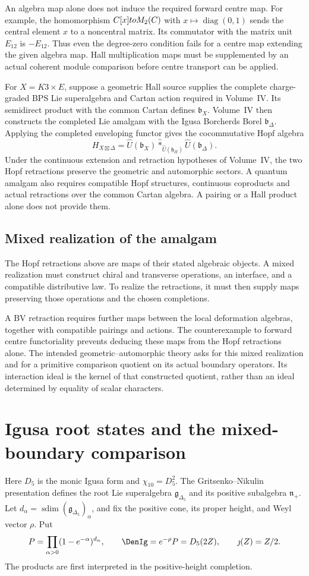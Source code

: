 An algebra map alone does not induce the required forward centre map. For example, the homomorphism $C[x]to M_2(C)$ with $x\mapsto\operatorname{diag}(0,1)$ sends the central element $x$ to a noncentral matrix. Its commutator with the matrix unit $E_{12}$ is $-E_{12}$. Thus even the degree-zero condition fails for a centre map extending the given algebra map. Hall multiplication maps must be supplemented by an actual coherent module comparison before centre transport can be applied.

For $X=K3\times E$, suppose a geometric Hall source supplies the complete charge-graded BPS Lie superalgebra and Cartan action required in Volume~IV. Its semidirect product with the common Cartan defines $\mathfrak b_X$. Volume~IV then constructs the completed Lie amalgam with the Igusa Borcherds Borel $\mathfrak b_\Delta$. Applying the completed enveloping functor gives the cocommutative Hopf algebra
\[
 H_{X\boxtimes\Delta}
 =\widehat U(\mathfrak b_X)
  \widehat *_{\widehat U(\mathfrak h_\Pi)}
  \widehat U(\mathfrak b_\Delta).
\]
Under the continuous extension and retraction hypotheses of Volume~IV,
the two Hopf retractions preserve the geometric and automorphic sectors.
A quantum amalgam also requires compatible Hopf structures, continuous
coproducts and actual retractions over the common Cartan algebra. A pairing
or a Hall product alone does not provide them.

\subsection{Mixed realization of the amalgam}
The Hopf retractions above are maps of their stated algebraic objects. A mixed realization must construct chiral and transverse operations, an interface, and a compatible distributive law. To realize the retractions, it must then supply maps preserving those operations and the chosen completions.

A BV retraction requires further maps between the local deformation algebras, together with compatible pairings and actions. The counterexample to forward centre functoriality prevents deducing these maps from the Hopf retractions alone. The intended geometric--automorphic theory asks for this mixed realization and for a primitive comparison quotient on its actual boundary operators. Its interaction ideal is the kernel of that constructed quotient, rather than an ideal determined by equality of scalar characters.

\section{Igusa root states and the mixed-boundary comparison}
Here $D_5$ is the monic Igusa form and $\chi_{10}=D_5^2$.
The Gritsenko--Nikulin presentation defines the root Lie superalgebra
$\mathfrak g_{\Delta_5}$ and its positive subalgebra $\mathfrak n_+$.
Let $d_\alpha=\operatorname{sdim}(\mathfrak g_{\Delta_5})_\alpha$,
and fix the positive cone, its proper height, and Weyl vector $\rho$.
Put
\[
 P=\prod_{\alpha>0}(1-e^{-\alpha})^{d_\alpha},\qquad
 \DenIg=e^{-\rho}P=D_5(2Z),\qquad \jmath(Z)=Z/2.
\]
The products are first interpreted in the positive-height completion.

